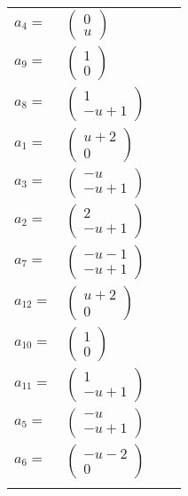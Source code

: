 \documentclass[1p]{elsarticle_modified}
\theoremstyle{definition}
\begin{document}
\begin{tabular}{m{7pt} m{180pt} m{7pt} m{180pt} }
\flushright $a_{4}=$&$\begin{pmatrix}0\\u\end{pmatrix}$ \\
\flushright $a_{9}=$&$\begin{pmatrix}1\\0\end{pmatrix}$ \\
\flushright $a_{8}=$&$\begin{pmatrix}1\\- u+1\end{pmatrix}$ \\
\flushright $a_{1}=$&$\begin{pmatrix}u+2\\0\end{pmatrix}$ \\
\flushright $a_{3}=$&$\begin{pmatrix}- u\\- u+1\end{pmatrix}$ \\
\flushright $a_{2}=$&$\begin{pmatrix}2\\- u+1\end{pmatrix}$ \\
\flushright $a_{7}=$&$\begin{pmatrix}- u-1\\- u+1\end{pmatrix}$ \\
\flushright $a_{12}=$&$\begin{pmatrix}u+2\\0\end{pmatrix}$ \\
\flushright $a_{10}=$&$\begin{pmatrix}1\\0\end{pmatrix}$ \\
\flushright $a_{11}=$&$\begin{pmatrix}1\\- u+1\end{pmatrix}$ \\
\flushright $a_{5}=$&$\begin{pmatrix}- u\\- u+1\end{pmatrix}$ \\
\flushright $a_{6}=$&$\begin{pmatrix}- u-2\\0\end{pmatrix}$\\&\end{tabular}
\end{document}
